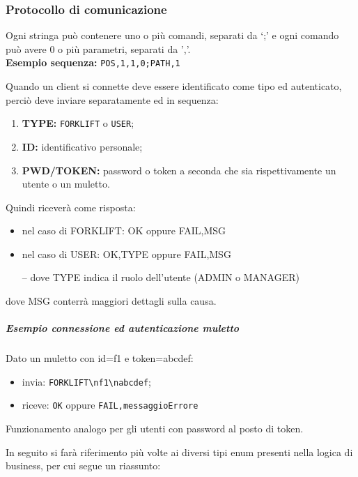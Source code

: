 \clearpage
\subsubsection{Protocollo di comunicazione}
\label{comm-protocol}

Ogni stringa può contenere uno o più comandi, separati da ‘;' e ogni comando può avere 0 o più parametri, separati da ',’. \\
\textbf{Esempio sequenza:} \texttt{POS,1,1,0;PATH,1}

    Quando un client si connette deve essere identificato come tipo ed autenticato, perciò deve inviare separatamente ed in sequenza:
    \begin{enumerate}
        \item \textbf{TYPE: }\texttt{FORKLIFT} o \texttt{USER};
        \item \textbf{ID: } identificativo personale;
        \item \textbf{PWD/TOKEN: } password o token a seconda che sia rispettivamente un utente o un muletto.
    \end{enumerate}
    Quindi riceverà come risposta:
    \begin{itemize}

        \item nel caso di FORKLIFT: OK oppure FAIL,MSG

        \item nel caso di USER: OK,TYPE oppure FAIL,MSG

        \subitem -- dove TYPE indica il ruolo dell’utente (ADMIN o MANAGER)
    \end{itemize}
    dove MSG conterrà maggiori dettagli sulla causa.

    \subparagraph{Esempio connessione ed autenticazione muletto}
        Dato un muletto con id=f1 e token=abcdef:
        \begin{itemize}
            \item invia: \texttt{FORKLIFT\textbackslash nf1\textbackslash nabcdef};

            \item riceve: \texttt{OK} oppure \texttt{FAIL,messaggioErrore}
        \end{itemize}


        Funzionamento analogo per gli utenti con password al posto di token.

\clearpage
{}
    In seguito si farà riferimento più volte ai diversi tipi enum presenti nella logica di business, per cui segue un riassunto:


